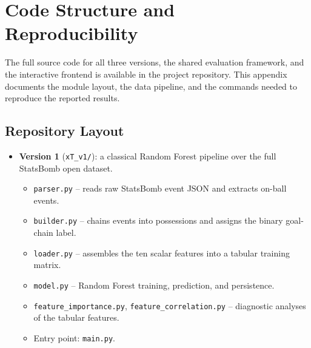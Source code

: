 \chapter{Code Structure and Reproducibility}\label{app:code}

The full source code for all three versions, the shared evaluation framework, and the interactive frontend is available in the project repository. This appendix documents the module layout, the data pipeline, and the commands needed to reproduce the reported results.

\section{Repository Layout}

\begin{itemize}
    \item \textbf{Version 1} (\texttt{xT\_v1/}): a classical Random Forest pipeline over the full StatsBomb open dataset.
    \begin{itemize}
        \item \texttt{parser.py} -- reads raw StatsBomb event JSON and extracts on-ball events.
        \item \texttt{builder.py} -- chains events into possessions and assigns the binary goal-chain label.
        \item \texttt{loader.py} -- assembles the ten scalar features into a tabular training matrix.
        \item \texttt{model.py} -- Random Forest training, prediction, and persistence.
        \item \texttt{feature\_importance.py}, \texttt{feature\_correlation.py} -- diagnostic analyses of the tabular features.
        \item Entry point: \texttt{main.py}.
    \end{itemize}


\end{itemize}

